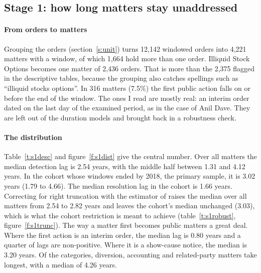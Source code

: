 \documentclass[letterpaper,11pt,leqno]{article}
\begin{document}
\subsection{Stage 1: how long matters stay unaddressed}\label{s:r1}

\paragraph{From orders to matters} Grouping the orders (section~\ref{s:unit}) turns 12,142 windowed orders into 4,221 matters with a window, of which 1,664 hold more than one order. Illiquid Stock Options becomes one matter of 2,436 orders. That is more than the 2,375 flagged in the descriptive tables, because the grouping also catches spellings such as ``illiquid stocks options''. In 316 matters (7.5\%) the first public action falls on or before the end of the window. The ones I read are mostly real: an interim order dated on the last day of the examined period, as in the case of Anil Dave. They are left out of the duration models and brought back in a robustness check.

\paragraph{The distribution} Table~\ref{t:s1desc} and figure~\ref{f:s1dist} give the central number. Over all matters the median detection lag is 2.54 years, with the middle half between 1.31 and 4.12 years. In the cohort whose windows ended by 2018, the primary sample, it is 3.02 years (1.79 to 4.66). The median resolution lag in the cohort is 1.66 years. Correcting for right truncation with the estimator of \citet{EP99} raises the median over all matters from 2.54 to 2.82 years and leaves the cohort's median unchanged (3.03), which is what the cohort restriction is meant to achieve (table~\ref{t:s1robust}, figure~\ref{f:s1trunc}). The way a matter first becomes public matters a great deal. Where the first action is an interim order, the median lag is 0.80 years and a quarter of lags are non-positive. Where it is a show-cause notice, the median is 3.20 years. Of the categories, diversion, accounting and related-party matters take longest, with a median of 4.26 years.

\begin{table}[htb]
\caption{Detection and resolution lags by matter, in years}

\label{t:s1desc}\end{table}
\end{document}
